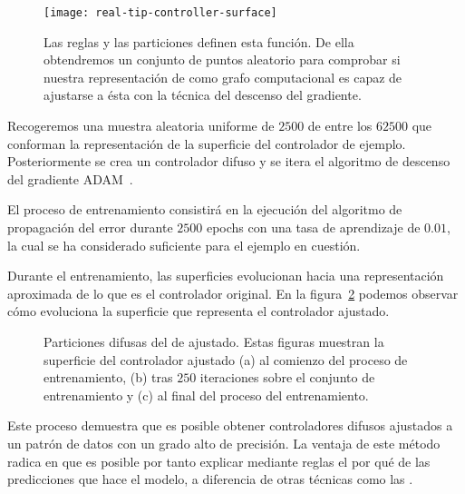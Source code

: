 \begin{figure}[b]
	\centering
	\texttt{[image: real-tip-controller-surface]}
	\caption[Superficie de la función que modela el  de ejemplo]{Las reglas y las particiones definen esta función. De ella obtendremos un conjunto de puntos aleatorio para comprobar si nuestra representación de  como grafo computacional es capaz de ajustarse a ésta con la técnica del descenso del gradiente.}
	\label{fig:real-tip-controller-surface}
\end{figure}

Recogeremos una muestra aleatoria uniforme de $2500$ de entre los $62500$ que conforman la representación de la superficie del controlador de ejemplo. Posteriormente se crea un controlador difuso y se itera el algoritmo de descenso del gradiente ADAM~\cite{kingma2014adam}.

El proceso de entrenamiento consistirá en la ejecución del algoritmo de propagación del error durante $2500$ epochs con una tasa de aprendizaje de $0.01$, la cual se ha considerado suficiente para el ejemplo en cuestión.

Durante el entrenamiento, las superficies evolucionan hacia una representación aproximada de lo que es el controlador original. En la figura~\ref{fig:adjusted-tip-controller-training} podemos observar cómo evoluciona la superficie que representa el controlador ajustado.

\begin{figure}
	\centering
	\qquad
	\qquad
	\caption[Evolución del  de acuerdo al conjunto de datos extraido del ]{Particiones difusas del  de ajustado. Estas figuras muestran la superficie del controlador ajustado (a) al comienzo del proceso de entrenamiento, (b) tras $250$ iteraciones sobre el conjunto de entrenamiento y (c) al final del proceso del entrenamiento.}
	\label{fig:adjusted-tip-controller-training}
\end{figure}

Este proceso demuestra que es posible obtener controladores difusos ajustados a un patrón de datos con un grado alto de precisión. La ventaja de este método radica en que es posible por tanto explicar mediante reglas el por qué de las predicciones que hace el modelo, a diferencia de otras técnicas como las .